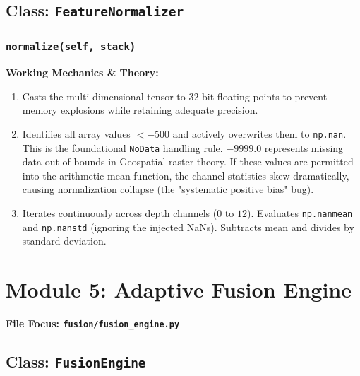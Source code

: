 \documentclass[11pt,a4paper,oneside]{report}
\begin{document}
\section{Class: \texttt{FeatureNormalizer}}
\subsection{\texttt{normalize(self, stack)}}
\textbf{Working Mechanics \& Theory:}
\begin{enumerate}
    \item Casts the multi-dimensional tensor to 32-bit floating points to prevent memory explosions while retaining adequate precision.
    \item Identifies all array values $<-500$ and actively overwrites them to \texttt{np.nan}. This is the foundational \texttt{NoData} handling rule. $-9999.0$ represents missing data out-of-bounds in Geospatial raster theory. If these values are permitted into the arithmetic mean function, the channel statistics skew dramatically, causing normalization collapse (the "systematic positive bias" bug).
    \item Iterates continuously across depth channels ($0$ to $12$). Evaluates \texttt{np.nanmean} and \texttt{np.nanstd} (ignoring the injected NaNs). Subtracts mean and divides by standard deviation.
\end{enumerate}

\chapter{Module 5: Adaptive Fusion Engine}
\textbf{File Focus: \texttt{fusion/fusion\_engine.py}}

\section{Class: \texttt{FusionEngine}}
\end{document}
